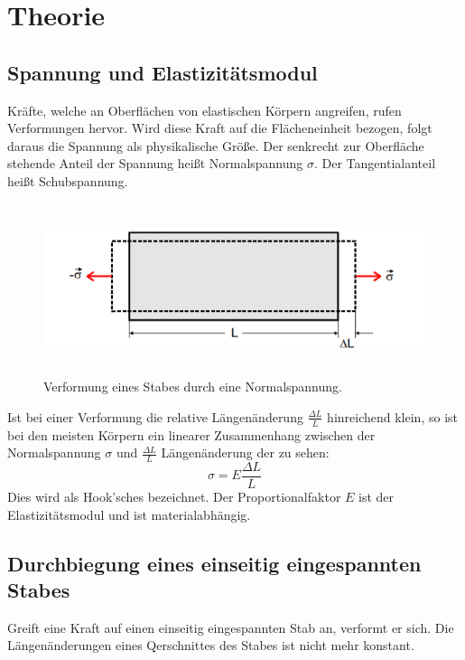 \section{Theorie}
\label{sec:Theorie}

\cite{sample}
\subsection{Spannung und Elastizitätsmodul}
Kräfte, welche an Oberflächen von elastischen Körpern angreifen, rufen Verformungen
hervor. Wird diese Kraft auf die Flächeneinheit bezogen, folgt daraus die
Spannung als physikalische Größe. Der senkrecht zur Oberfläche stehende Anteil der
Spannung heißt Normalspannung $\sigma$. Der Tangentialanteil heißt Schubspannung.

\begin{figure}[H]
  \centering
  \includegraphics[height=5cm]{biegungbild1.PNG}
  \caption{Verformung eines Stabes durch eine Normalspannung.}
  \label{fig:biegungbild1}
\end{figure}

Ist bei einer Verformung die relative Längenänderung $\frac{\Delta L}{L}$ hinreichend klein, so ist
bei den meisten Körpern ein linearer Zusammenhang zwischen
der Normalspannung $\sigma$ und $\frac{\Delta L}{L}$ Längenänderung der zu sehen:
\begin{equation}
  \sigma = E\frac{\Delta L}{L}
\end{equation}
Dies wird als Hook'sches bezeichnet. Der Proportionalfaktor $E$ ist
der Elastizitätsmodul und ist materialabhängig.

\subsection{Durchbiegung eines einseitig eingespannten Stabes}
Greift eine Kraft auf einen einseitig eingespannten Stab an, verformt er sich.
Die Längenänderungen eines Qerschnittes des Stabes ist nicht mehr konstant.

